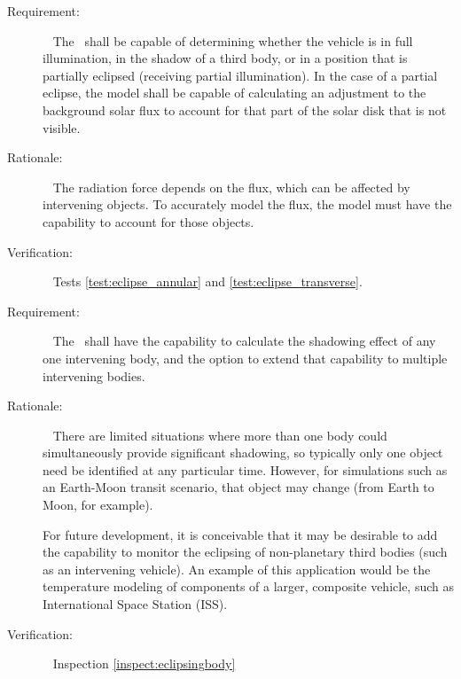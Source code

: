 \label{reqt:functional_eclipse}
\begin{description}
  \item[Requirement:]\ \newline
    The \RadiationPressureDesc\ shall be capable of determining whether the vehicle is in full
    illumination, in the shadow of a third body, or in a position that is
    partially eclipsed (receiving partial illumination).  In the case of a
    partial eclipse, the model shall be capable of calculating an adjustment to
    the background solar flux to account for that part of the solar disk that is
    not visible.
  \item[Rationale:]\ \newline
    The radiation force depends on the flux, which can be affected by
    intervening objects.  To accurately model the flux, the model must have the
    capability to account for those objects.
  \item[Verification:]\ \newline
    Tests \vref{test:eclipse_annular} and \vref{test:eclipse_transverse}.
\end{description}

\label{reqt:eclipsingbody}
\begin{description}
   \item[Requirement:]\ \newline
    The \RadiationPressureDesc\ shall have the capability to calculate the shadowing
    effect of any one intervening body, and the option to extend that capability to
    multiple intervening bodies.
  \item[Rationale:]\ \newline
    There are limited situations where more than one body could
    simultaneously provide significant shadowing, so typically only one object need
    be identified at any particular time.  However, for simulations such
    as an Earth-Moon transit scenario, that object may change (from Earth
    to Moon, for example).

      For future development, it is conceivable that it may be desirable to add the capability
      to monitor the eclipsing of non-planetary third bodies (such as an intervening
      vehicle).  An example of this application would be the temperature modeling of components
      of a larger, composite vehicle, such as International Space Station (ISS).
  \item[Verification:]\ \newline
    Inspection \vref{inspect:eclipsingbody}
\end{description}
